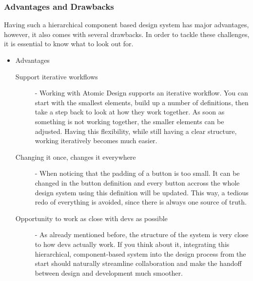 \subsubsection{Advantages and Drawbacks}
Having such a hierarchical component based design system has major advantages, however, it also
comes with several drawbacks. In order to tackle these challenges, it is essential to know what to
look out for.

\begin{itemize}
	\item Advantages
	      \begin{description}
		      \item[Support iterative workflows] - Working with Atomic Design supports an iterative
		            workflow. You can start with the smallest elements, build up a number of
		            definitions, then take a step back to look at how they work together. As soon as
		            something is not working together, the smaller elements can be adjusted. Having
		            this flexibility, while still having a clear structure, working iteratively
		            becomes much easier. 
		      \item[Changing it once, changes it everywhere] - When noticing that the padding
		            of a button is too small. It can be changed in the button definition and every
		            button accross the whole design system using this definition will be updated.
		            This way, a tedious redo of everything is avoided, since there is always one
		            source of truth.
		      \item[Opportunity to work as close with devs as possible] - As already mentioned
		            before, the structure of the system is very close to how devs actually work.
		            If you think about it, integrating this hierarchical, component-based system
		            into the design process from the start should naturally streamline collaboration
		            and make the handoff between design and development much smoother.


\end{description}
\end{itemize}
